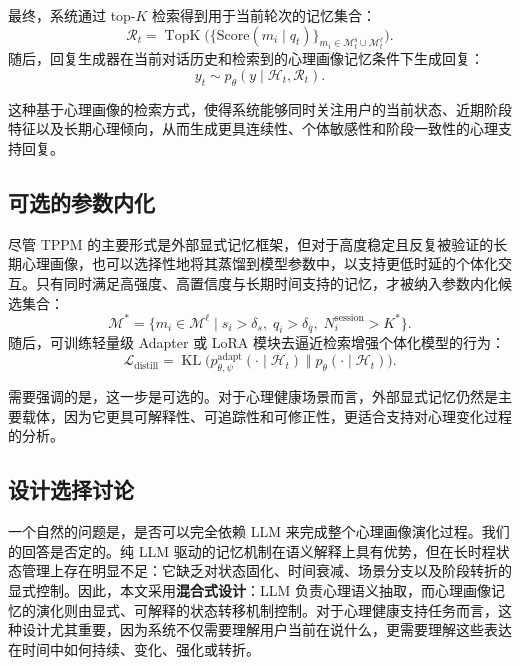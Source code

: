 \documentclass[12pt,a4paper]{article}
\newcommand{\methodname}{\textsc{TPPM}}
\begin{document}
最终，系统通过 top-$K$ 检索得到用于当前轮次的记忆集合：
\begin{equation}
\mathcal{R}_t = \operatorname{TopK}\Big(\{\text{Score}(m_i \mid q_t)\}_{m_i \in \mathcal{M}^{\text{s}}_t \cup \mathcal{M}^{\ell}_t}\Big).
\label{eq:topk}
\end{equation}
随后，回复生成器在当前对话历史和检索到的心理画像记忆条件下生成回复：
\begin{equation}
y_t \sim p_\theta(y \mid \mathcal{H}_t, \mathcal{R}_t).
\label{eq:gen2}
\end{equation}

这种基于心理画像的检索方式，使得系统能够同时关注用户的当前状态、近期阶段特征以及长期心理倾向，从而生成更具连续性、个体敏感性和阶段一致性的心理支持回复。

\subsection{可选的参数内化}

尽管 \methodname{} 的主要形式是外部显式记忆框架，但对于高度稳定且反复被验证的长期心理画像，也可以选择性地将其蒸馏到模型参数中，以支持更低时延的个体化交互。只有同时满足高强度、高置信度与长期时间支持的记忆，才被纳入参数内化候选集合：
\begin{equation}
\mathcal{M}^* = \{m_i \in \mathcal{M}^{\ell} \mid s_i > \delta_s,\; q_i > \delta_q,\; N^{\text{session}}_i > K^*\}.
\label{eq:internalize_candidates}
\end{equation}
随后，可训练轻量级 Adapter 或 LoRA 模块去逼近检索增强个体化模型的行为：
\begin{equation}
\mathcal{L}_{\text{distill}} = \operatorname{KL}\!\Big(p^{\text{adapt}}_{\theta,\psi}(\cdot \mid \mathcal{H}_t) \;\big\Vert\; p_{\theta}(\cdot \mid \mathcal{H}_t)\Big).
\label{eq:distill}
\end{equation}

需要强调的是，这一步是可选的。对于心理健康场景而言，外部显式记忆仍然是主要载体，因为它更具可解释性、可追踪性和可修正性，更适合支持对心理变化过程的分析。

\subsection{设计选择讨论}

一个自然的问题是，是否可以完全依赖 LLM 来完成整个心理画像演化过程。我们的回答是否定的。纯 LLM 驱动的记忆机制在语义解释上具有优势，但在长时程状态管理上存在明显不足：它缺乏对状态固化、时间衰减、场景分支以及阶段转折的显式控制。因此，本文采用\textbf{混合式设计}：LLM 负责心理语义抽取，而心理画像记忆的演化则由显式、可解释的状态转移机制控制。对于心理健康支持任务而言，这种设计尤其重要，因为系统不仅需要理解用户当前在说什么，更需要理解这些表达在时间中如何持续、变化、强化或转折。
\end{document}
